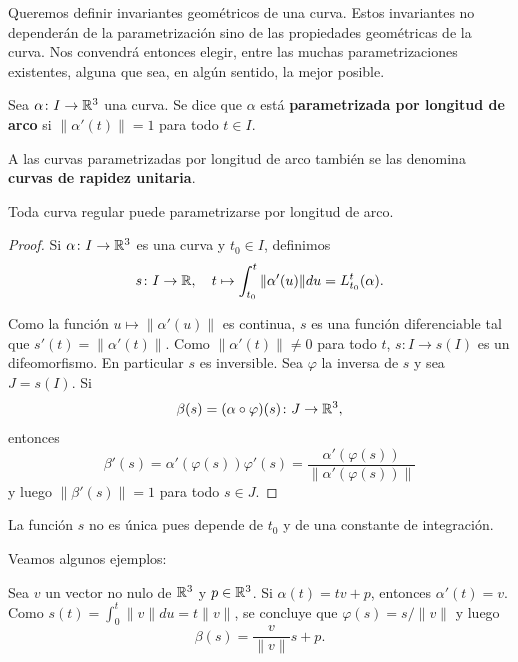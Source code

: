 Queremos definir invariantes geométricos de una curva. Estos invariantes no
dependerán de la parametrización sino de las propiedades geométricas de la
curva. Nos convendrá entonces elegir, entre las muchas parametrizaciones
existentes, alguna que sea, en algún sentido, la mejor posible.

\begin{definition}
	Sea $\alpha\colon I\to\mathbb{R}^3$ una curva. Se dice que $\alpha$ está
	\textbf{parametrizada por longitud de arco} si $\|\alpha'(t)\|=1$ para todo
	$t\in I$.
\end{definition}

A las curvas parametrizadas por longitud de arco también se las denomina
\textbf{curvas de rapidez unitaria}.

\begin{theorem}
	Toda curva regular puede parametrizarse por longitud de arco.
\end{theorem}

\begin{proof}
	Si $\alpha\colon I\to\mathbb{R}^3$ es una curva y $t_0\in I$, definimos
	\[
		s\colon I\to\mathbb{R},\quad
		t\mapsto\int_{t_0}^t\|\alpha'(u)\|du=L_{t_0}^t(\alpha).
	\]

	Como la función $u\mapsto \|\alpha'(u)\|$ es continua, $s$ es una función diferenciable 
	tal que $s'(t)=\|\alpha'(t)\|$. Como $\|\alpha'(t)\|\ne 0$
	para todo $t$, $s\colon I\to s(I)$ es un difeomorfismo. En particular $s$
	es inversible. Sea $\varphi$ la inversa de $s$ y sea $J=s(I)$. Si 
	\[
		\beta(s)=(\alpha\circ\varphi)(s)\colon J\to\mathbb{R}^3,
	\]
	entonces
	\[
		\beta'(s)=\alpha'(\varphi(s))\varphi'(s)=\frac{\alpha'(\varphi(s))}{\|\alpha'(\varphi(s))\|}
	\]
	y luego $\|\beta'(s)\|=1$ para todo $s\in J$. 
\end{proof}

\begin{remark}
	La función $s$ no es única pues depende de $t_0$ y de una constante de
	integración.
\end{remark}

Veamos algunos ejemplos:

\begin{example}
	Sea $v$ un vector no nulo de $\mathbb{R}^3$ y $p\in\mathbb{R}^3$.  Si $\alpha(t)=tv+p$,
	entonces $\alpha'(t)=v$.  Como $s(t)=\int_0^t\|v\|du=t\|v\|$, se concluye
	que $\varphi(s)=s/\|v\|$ y luego
	\[
		\beta(s)=\frac{v}{\|v\|}s+p.
	\]
\end{example}

